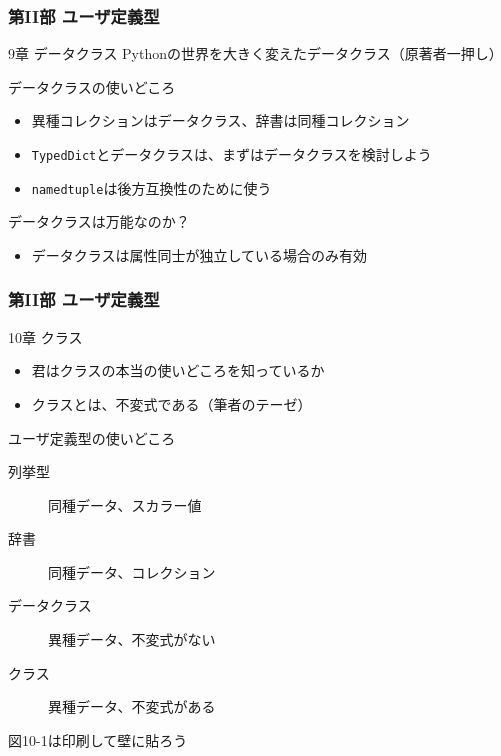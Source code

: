\documentclass[aspectratio=169,dvipdfmx,14pt,notheorems]{beamer}
\theoremstyle{definition}
\begin{document}
\begin{frame}\frametitle{第II部 ユーザ定義型}

\begin{block}{9章 データクラス}
Pythonの世界を大きく変えたデータクラス（原著者一押し）
\end{block}

\begin{exampleblock}{データクラスの使いどころ}
\begin{itemize}
\item 異種コレクションはデータクラス、辞書は同種コレクション
\item \texttt{TypedDict}とデータクラスは、まずはデータクラスを検討しよう
\item \texttt{namedtuple}は後方互換性のために使う
\end{itemize}
\end{exampleblock}

\begin{alertblock}{データクラスは万能なのか？}
\begin{itemize}
\item データクラスは属性同士が独立している場合のみ有効
\end{itemize}
\end{alertblock}

\end{frame}

\begin{frame}\frametitle{第II部 ユーザ定義型}

\begin{block}{10章 クラス}
\begin{itemize}
\item 君はクラスの本当の使いどころを知っているか
\item クラスとは、不変式である（筆者のテーゼ）
\end{itemize}
\end{block}

\begin{exampleblock}{ユーザ定義型の使いどころ}
\begin{description}
\item[列挙型]  同種データ、スカラー値
\item[辞書] 同種データ、コレクション
\item[データクラス] 異種データ、不変式がない
\item[クラス] 異種データ、不変式がある
\end{description}
\end{exampleblock}
図10-1は印刷して壁に貼ろう

\end{frame}
\end{document}

